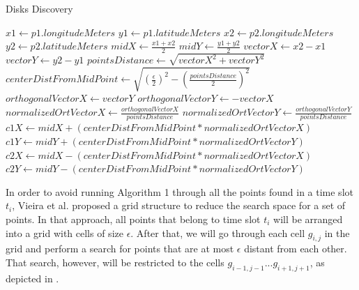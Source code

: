\begin{algorithm}
\caption{Disks Discovery}
\begin{algorithmic}[1]
    \State $x1 \gets p1.longitudeMeters$
    \State $y1 \gets p1.latitudeMeters$
    \State $x2 \gets p2.longitudeMeters$
    \State $y2 \gets p2.latitudeMeters$
    \State
    \State $midX \gets \frac{x1 + x2}{2}$
    \State $midY \gets \frac{y1 + y2}{2}$
    \State
    \State $vectorX \gets x2 - x1$
    \State $vectorY \gets y2 - y1$
    \State
    \State $pointsDistance \gets \sqrt{vectorX^2 + vectorY^2}$
    \State $centerDistFromMidPoint \gets \sqrt{(\frac{\epsilon}{2})^2 - (\frac{pointsDistance}{2})^2}$
    \State
    \State $orthogonalVectorX \gets vectorY$
    \State $orthogonalVectorY \gets -vectorX$
    \State
    \State $normalizedOrtVectorX \gets \frac{orthogonalVectorX}{pointsDistance}$
    \State $normalizedOrtVectorY \gets \frac{orthogonalVectorY}{pointsDistance}$
    \State
    \State $c1X \gets midX + (centerDistFromMidPoint * normalizedOrtVectorX)$
    \State $c1Y \gets midY + (centerDistFromMidPoint * normalizedOrtVectorY)$
    \State
    \State $c2X \gets midX - (centerDistFromMidPoint * normalizedOrtVectorX)$
    \State $c2Y \gets midY - (centerDistFromMidPoint * normalizedOrtVectorY)$
\end{algorithmic}
\end{algorithm}

In order to avoid running Algorithm 1 through all the points found in a time slot $t_i$, Vieira et al. \citep{vieira}
proposed a grid structure to reduce the search space for a set of points. In that approach, all points that belong to
time slot $t_i$ will be arranged into a grid with cells of size $\epsilon$. After that, we will go through each cell
$g_{i,j}$ in the grid and perform a search for points that are at most $\epsilon$ distant from each other. That search, however, will
be restricted to the cells $g_{i - 1, j - 1} ... g_{i + 1, j + 1}$, as depicted in .

